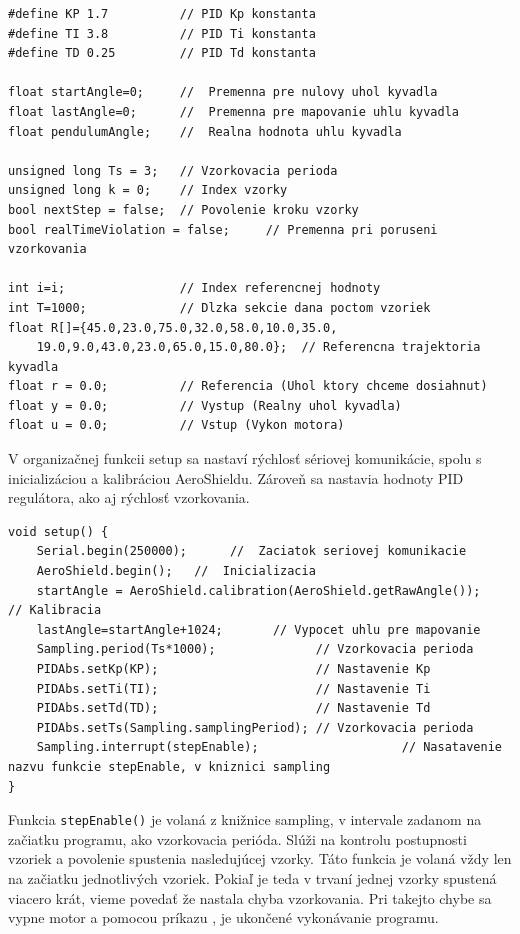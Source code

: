 \begin{lstlisting}[caption={Načítanie knižníc a premenných do programu.},captionpos=b]
#define KP 1.7          // PID Kp konstanta
#define TI 3.8          // PID Ti konstanta
#define TD 0.25         // PID Td konstanta

float startAngle=0;     //  Premenna pre nulovy uhol kyvadla
float lastAngle=0;      //  Premenna pre mapovanie uhlu kyvadla
float pendulumAngle;    //  Realna hodnota uhlu kyvadla

unsigned long Ts = 3;   // Vzorkovacia perioda 
unsigned long k = 0;    // Index vzorky 
bool nextStep = false;  // Povolenie kroku vzorky 
bool realTimeViolation = false;     // Premenna pri poruseni vzorkovania

int i=i;                // Index referencnej hodnoty 
int T=1000;             // Dlzka sekcie dana poctom vzoriek 
float R[]={45.0,23.0,75.0,32.0,58.0,10.0,35.0,
	19.0,9.0,43.0,23.0,65.0,15.0,80.0};  // Referencna trajektoria kyvadla
float r = 0.0;          // Referencia (Uhol ktory chceme dosiahnut)
float y = 0.0;          // Vystup (Realny uhol kyvadla)
float u = 0.0;          // Vstup (Vykon motora)
\end{lstlisting}

V organizačnej funkcii setup sa nastaví rýchlosť sériovej komunikácie, spolu s inicializáciou a kalibráciou AeroShieldu. Zároveň sa nastavia hodnoty PID 
regulátora, ako aj rýchlosť vzorkovania.  

\begin{lstlisting}[caption={Organzačná funkcia setup.},captionpos=b]
void setup() {   
	Serial.begin(250000);      //  Zaciatok seriovej komunikacie
	AeroShield.begin();   //  Inicializacia 
	startAngle = AeroShield.calibration(AeroShield.getRawAngle());        // Kalibracia
	lastAngle=startAngle+1024;       // Vypocet uhlu pre mapovanie 
	Sampling.period(Ts*1000);              // Vzorkovacia perioda 
	PIDAbs.setKp(KP);                      // Nastavenie Kp
	PIDAbs.setTi(TI);                      // Nastavenie Ti
	PIDAbs.setTd(TD);                      // Nastavenie Td
	PIDAbs.setTs(Sampling.samplingPeriod); // Vzorkovacia perioda
	Sampling.interrupt(stepEnable);  				   // Nasatavenie nazvu funkcie stepEnable, v kniznici sampling 
}
\end{lstlisting}

Funkcia \verb|stepEnable()| je volaná z knižnice sampling, v intervale zadanom na začiatku programu, ako vzorkovacia perióda. Slúži na kontrolu postupnosti vzoriek a povolenie spustenia nasledujúcej vzorky. Táto funkcia je volaná vždy len na začiatku jednotlivých vzoriek. Pokiaľ je teda v trvaní jednej vzorky spustená viacero krát, vieme povedať že nastala chyba vzorkovania. Pri takejto chybe sa vypne motor a pomocou príkazu , je ukončené vykonávanie programu. 

